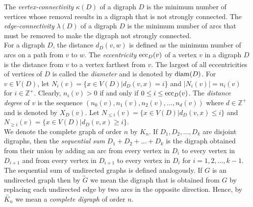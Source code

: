 \documentclass[a4paper,11pt]{article}
\begin{document}
The {\em vertex-connectivity} $\kappa(D)$ of a digraph $D$ is the minimum number of vertices whose removal results in a digraph that is not strongly connected. The {\em edge-connectivity} $\lambda(D)$ of a digraph $D$ is the minimum number of arcs that must be removed to make the digraph not strongly connected.\\


For a digraph \( D \), the distance \( d_D(v, w) \) is defined as the minimum number of arcs on a path from \(v\) to \(w\). The {\em eccentricity} ${\rm ecc}_D(v)$ of a vertex $v$ in a digraph $D$ is the distance from $v$ to a vertex farthest from $v$. The largest of all eccentricities of vertices of $D$ is called the {\em diameter} and is denoted by 
${\rm diam}(D)$. For $v \in V(D)$, let $ N_{i}(v)=\{x \in V(D)|d_{D}(v,x)=i \} $ and $ |N_{i}(v)|=n_i(v) $ for $ i \in \mathbb{Z}^{+} $.  Clearly, $n_i(v) >0$ if and only if $0\leq i \leq {\rm ecc}_D(v)$. 
The {\em distance degree} of $v$ is the sequence $(n_{0}(v),n_{1}(v),n_{2}(v),\ldots,n_{d}(v))$ where $d \in \mathbb{Z}^{+}$ and is denoted by $X_{D}(v)$. Let $ N_{\leq i}(v)=\{x \in V(D)|d_{D}(v,x)\leq i \} $ and  $ N_{\geq i}(v)=\{x \in V(D)|d_{D}(v,x)\geq i \} $.\\

We denote the complete graph of order $n$ by $K_n$. If $ D_1,D_2,\ldots, D_k $ are disjoint digraphs, then the {\em sequential sum} $ D_1 + D_2 + \ldots + D_k $ is the digraph obtained from their union by adding an arc from every vertex in $ D_i $ to every vertex in $ D_{i+1} $ and from every vertex in $ D_{i+1} $ to every vertex in $ D_{i} $ for $ i=1, 2, \ldots, k-1 $. The sequential sum of undirected graphs is defined analogously. If $G$ is an undirected graph then by $ \overleftrightarrow{G} $ we mean the digraph that is obtained from $G$ by replacing each undirected edge by two arcs in the opposite direction. Hence, by $\overleftrightarrow{K_n}$ we mean a {\em  complete digraph} of order $n$.\\
\end{document}
